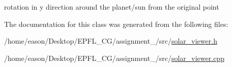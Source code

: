 rotation in y direction around the planet/sun from the original point 



The documentation for this class was generated from the following files\+:\begin{DoxyCompactItemize}
\item 
/home/eason/\+Desktop/\+E\+P\+F\+L\+\_\+\+C\+G/assignment\+\_/src/\hyperlink{solar__viewer_8h}{solar\+\_\+viewer.\+h}\item 
/home/eason/\+Desktop/\+E\+P\+F\+L\+\_\+\+C\+G/assignment\+\_/src/\hyperlink{solar__viewer_8cpp}{solar\+\_\+viewer.\+cpp}\end{DoxyCompactItemize}
